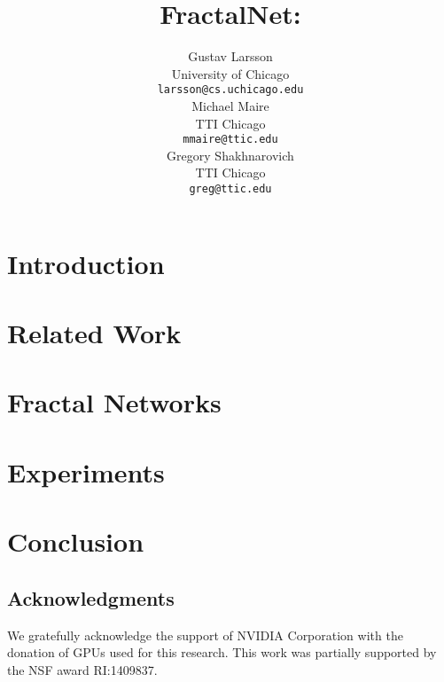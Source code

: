 \documentclass{article}
\title{%
   FractalNet:\\%
   \resizebox{\textwidth}{!}{Ultra-Deep Neural Networks without Residuals}%
}
\author{%
   Gustav Larsson\\
   University of Chicago\\
   \texttt{larsson@cs.uchicago.edu}\\
   \And
   Michael Maire\\
   TTI Chicago\\
   \texttt{mmaire@ttic.edu}\\
   \And
   Gregory Shakhnarovich\\
   TTI Chicago\\
   \texttt{greg@ttic.edu}%
}
\begin{document}
\maketitle

\begin{abstract}

\end{abstract}

\section{Introduction}
\label{sec:intro}


\section{Related Work}
\label{sec:related}


\section{Fractal Networks}
\label{sec:method}


\section{Experiments}
\label{sec:results}


\section{Conclusion}
\label{sec:discussion}


\subsection*{Acknowledgments}
We gratefully acknowledge the support of NVIDIA Corporation with the donation
of GPUs used for this research.  This work was partially supported by the NSF
award RI:1409837.

{\small


}
\end{document}
